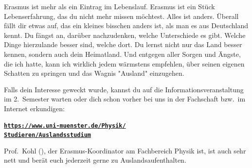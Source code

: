 \begin{multicols}{2}
Erasmus ist mehr als ein Eintrag im Lebenslauf.
Erasmus ist ein Stück Lebenserfahrung, das du nicht mehr missen möchtest.
Alles ist anders.
Überall fällt dir etwas auf, das ein kleines bisschen anders ist, als man es aus Deutschland kennt.
Du fängst an, darüber nachzudenken, welche Unterschiede es gibt.
Welche Dinge hierzulande besser sind, welche dort.
Du lernst nicht nur das Land besser kennen, sondern auch dein Heimatland.
Und entgegen aller Sorgen und Ängste, die ich hatte, kann ich wirklich jedem wärmstens empfehlen, über seinen eigenen Schatten zu springen und das Wagnis "Ausland" einzugehen.

Falls dein Interesse geweckt wurde, kannst du auf die Informationsveranstaltung im 2.~Semester warten oder dich schon vorher bei uns in der Fachschaft bzw.\ im Internet erkundigen:
\begin{center}
	\href{https://www.uni-muenster.de/Physik/Studieren/Auslandsstudium}{\textbf{\texttt{https://www.uni-muenster.de/Physik/\\Studieren/Auslandsstudium}}}
\end{center}

Prof.~Kohl (), der Erasmus-Koordinator am Fachbereich Physik ist, ist auch sehr nett und berät euch jederzeit gerne zu Auslandsaufenthalten.

\end{multicols}
